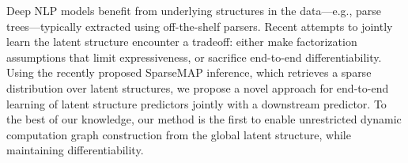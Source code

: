 Deep NLP models benefit from underlying structures in the data---e.g., parse trees---typically extracted using off-the-shelf parsers. Recent attempts to jointly learn the latent structure encounter a tradeoff: either make factorization assumptions that limit expressiveness, or sacrifice end-to-end differentiability. Using the recently proposed SparseMAP inference, which retrieves a sparse distribution over latent structures, we propose a novel approach for end-to-end learning of latent structure predictors jointly with a downstream predictor. To the best of our knowledge, our method is the first to enable unrestricted dynamic computation graph construction from the global latent structure, while maintaining differentiability.
